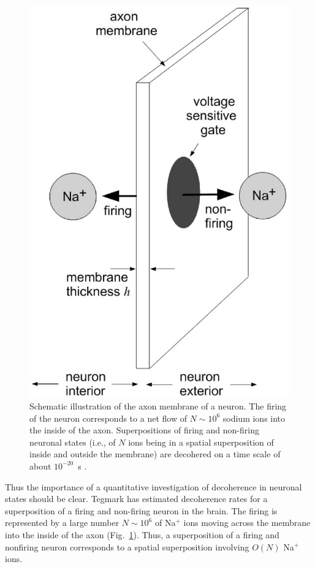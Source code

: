 \documentclass[twocolumn,aps,floatfix,amsmath,amssymb,showpacs,nofootinbib]{revtex4}
\begin{document}
\begin{figure}
\begin{center}
\includegraphics[scale=.3]{neuron-n.eps}
\end{center}
\caption[Schematic illustration of the axon
membrane of a neuron]{\label{fig:neuron} Schematic illustration of the
  axon membrane of a neuron. The firing of the neuron corresponds to a
  net flow of $N \sim 10^6$ sodium ions into the inside of the axon.
  Superpositions of firing and non-firing neuronal states (i.e., of
  $N$ ions being in a spatial superposition of inside and outside the
  membrane) are decohered on a time scale of about $10^{-20}$~s
  \cite{Tegmark:2000:wz}. }
\end{figure}

Thus the importance of a quantitative investigation of decoherence in
neuronal states should be clear. Tegmark \cite{Tegmark:2000:wz} has
estimated decoherence rates for a superposition of a firing and
non-firing neuron in the brain. The firing is represented by a large
number $N \sim 10^6$ \cite{Tegmark:2000:wz} of Na$^+$ ions moving
across the membrane into the inside of the axon
(Fig.~\ref{fig:neuron}). Thus, a superposition of a firing and
nonfiring neuron corresponds to a spatial superposition involving
$O(N)$ Na$^+$ ions.
\end{document}
